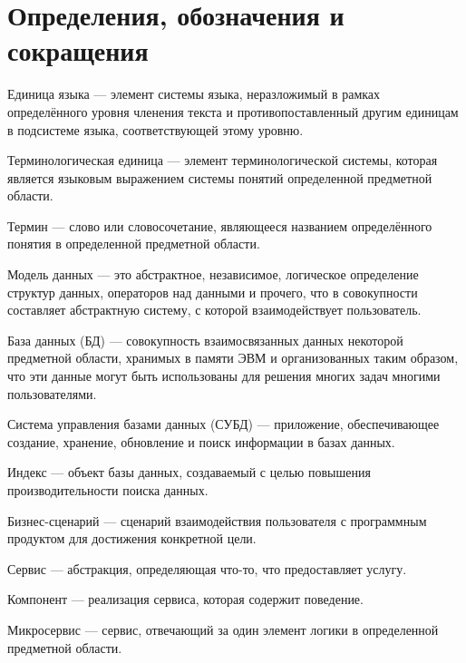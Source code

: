 \section*{Определения, обозначения и сокращения}

Единица языка --- элемент системы языка, неразложимый в рамках определённого уровня членения текста и противопоставленный другим единицам в подсистеме языка, соответствующей этому уровню.

Терминологическая единица --- элемент терминологической системы, которая является языковым выражением системы понятий определенной предметной области.

Термин --- слово или словосочетание, являющееся названием определённого понятия в определенной предметной области.

Модель данных --- это абстрактное, независимое, логическое определение структур данных, операторов над данными и прочего, что в совокупности составляет абстрактную систему, с которой взаимодействует пользователь.

База данных (БД) --- совокупность взаимосвязанных данных некоторой предметной области, хранимых в памяти ЭВМ и организованных таким образом, что эти данные могут быть использованы для решения многих задач многими пользователями.


Система управления базами данных (СУБД) --- приложение, обеспечивающее создание, хранение, обновление и поиск информации в базах данных.

Индекс --- объект базы данных, создаваемый с целью повышения производительности поиска данных.

Бизнес-сценарий --- сценарий взаимодействия пользователя с программным продуктом для достижения конкретной цели.

Сервис --- абстракция, определяющая что-то, что предоставляет услугу.

Компонент --- реализация сервиса, которая содержит поведение.

Микросервис --- сервис, отвечающий за один элемент логики в определенной предметной области.

\pagebreak
